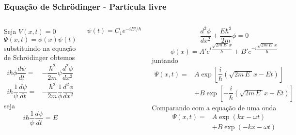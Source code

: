 \documentclass[12pt,brazil,table]{beamer}
\begin{document}
\begin{frame}
  \frametitle{Equação de Schrödinger - Partícula livre}
  \fontsize{9pt}{11pt}\selectfont
        
    \begin{columns}[c]

      \column{5cm}
      Seja $V(x,t)=0$
      \[
        \Psi (x,t) = \phi(x)\psi(t)
      \]
      substituindo na equação de Schrödinger obtemos
      \[
        \begin{align*}
          i\hbar \phi\dfrac{d \psi}{d t} =&  -\dfrac{\hbar^2}{2m}\psi \dfrac{d^2\phi}{dx^2}\\
          i\hbar \dfrac{1}{\psi}\dfrac{d \psi}{d t} =& -\dfrac{\hbar^2}{2m}\dfrac{1}{\phi}\dfrac{d^2\phi}{dx^2}
        \end{align*}
      \]
      seja
      \[
       i\hbar \dfrac{1}{\psi}\dfrac{d \psi}{d t} = E
      \]

      \[
       \psi(t) = C_1e^{-iEt/\hbar}
      \]

      \column{5cm}
      \[
        \dfrac{d^2\phi}{dx^2} + \dfrac{E\hbar^2}{2m}\phi =0
      \]
      \[
       \phi(x) = A'e^{i\dfrac{\sqrt{2m\,E\;}x}{\hbar}}+B'e^{-i\dfrac{\sqrt{2m\,E\;}x}{\hbar}}
      \]
      juntando
      \[
        \begin{align*}
          \Psi(x,t) =&  A \exp \left[ \dfrac{i}{\hbar}\left(  \sqrt{2m\,E\;}x - Et\right) \right]\\ 
          &  + B \exp \left[ -\dfrac{i}{\hbar}\left(  \sqrt{2m\,E\;}x - Et\right) \right]
        \end{align*}        
      \]
      Comparando com a equação de uma onda
      \[
        \begin{align*}
          \Psi(x,t) =&  A \exp \left(  kx - \omega t\right) \\
          &+ B \exp \left( -kx - \omega t\right)
        \end{align*}
      \]

      
    \end{columns}
  
\end{frame}
    
\end{document}

